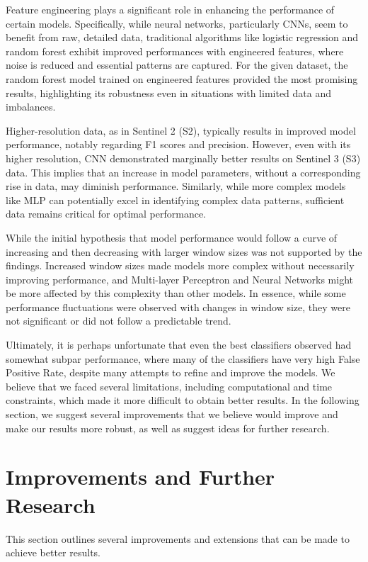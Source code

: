 \documentclass[a4paper,11pt]{report}
\begin{document}
Feature engineering plays a significant role in enhancing the performance of certain models. Specifically, while neural networks, particularly CNNs, seem to benefit from raw, detailed data, traditional algorithms like logistic regression and random forest exhibit improved performances with engineered features, where noise is reduced and essential patterns are captured. For the given dataset, the random forest model trained on engineered features provided the most promising results, highlighting its robustness even in situations with limited data and imbalances.

Higher-resolution data, as in Sentinel 2 (S2), typically results in improved model performance, notably regarding F1 scores and precision. However, even with its higher resolution, CNN demonstrated marginally better results on Sentinel 3 (S3) data. This implies that an increase in model parameters, without a corresponding rise in data, may diminish performance. Similarly, while more complex models like MLP can potentially excel in identifying complex data patterns, sufficient data remains critical for optimal performance.

While the initial hypothesis that model performance would follow a curve of increasing and then decreasing with larger window sizes was not supported by the findings. Increased window sizes made models more complex without necessarily improving performance, and Multi-layer Perceptron and Neural Networks might be more affected by this complexity than other models. In essence, while some performance fluctuations were observed with changes in window size, they were not significant or did not follow a predictable trend.

Ultimately, it is perhaps unfortunate that even the best classifiers observed had somewhat subpar performance, where many of the classifiers have very high False Positive Rate, despite many attempts to refine and improve the models. We believe that we faced several limitations, including computational and time constraints, which made it more difficult to obtain better results. In the following section, we suggest several improvements that we believe would improve and make our results more robust, as well as suggest ideas for further research. 

\section{Improvements and Further Research}
This section outlines several improvements and extensions that can be made to achieve better results.
\end{document}
